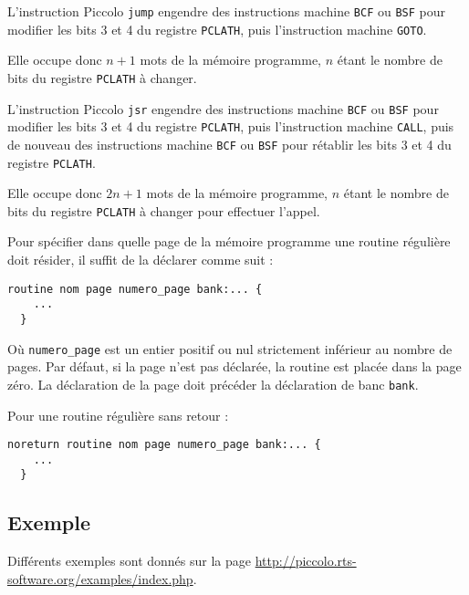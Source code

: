 
L'instruction Piccolo \texttt{jump} engendre des instructions machine \texttt{BCF} ou \texttt{BSF} pour modifier les bits 3 et 4 du registre \texttt{PCLATH}, puis l'instruction machine \texttt{GOTO}.

Elle occupe donc $n+1$ mots de la mémoire programme, $n$ étant le nombre de bits du registre \texttt{PCLATH} à changer.





L'instruction Piccolo  \texttt{jsr} engendre des instructions machine \texttt{BCF} ou \texttt{BSF} pour modifier les bits 3 et 4 du registre \texttt{PCLATH}, puis l'instruction machine \texttt{CALL}, puis de nouveau des instructions machine \texttt{BCF} ou \texttt{BSF} pour rétablir les bits 3 et 4 du registre \texttt{PCLATH}.

Elle occupe donc $2n+1$ mots de la mémoire programme, $n$ étant le nombre de bits du registre \texttt{PCLATH} à changer pour effectuer l'appel.


Pour spécifier dans quelle page de la mémoire programme une routine régulière doit résider, il suffit de la déclarer comme suit :
\begin{lstlisting}[language=piccolo]
  routine nom page numero_page bank:... {
    ...
  }
\end{lstlisting}

Où \texttt{numero\_page} est un entier positif ou nul strictement inférieur au nombre de pages. Par défaut, si la page n'est pas déclarée, la routine est placée dans la page zéro. La déclaration de la page doit précéder la déclaration de banc \texttt{bank}.

Pour une routine régulière sans retour :
\begin{lstlisting}[language=piccolo]
  noreturn routine nom page numero_page bank:... {
    ...
  }
\end{lstlisting}

\subsection{Exemple}

Différents exemples sont donnés sur la page \url{http://piccolo.rts-software.org/examples/index.php}.

